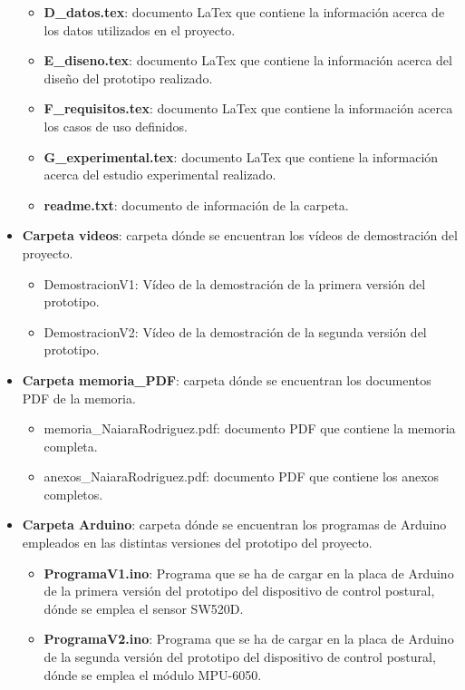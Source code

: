 \begin{itemize}
\begin{itemize}
        \item \textbf{D\_datos.tex}: documento LaTex que contiene la información acerca de los datos utilizados en el proyecto.
        \item \textbf{E\_diseno.tex}: documento LaTex que contiene la información acerca del diseño del prototipo realizado.
        \item \textbf{F\_requisitos.tex}: documento LaTex que contiene la información acerca los casos de uso definidos.
        \item \textbf{G\_experimental.tex}: documento LaTex que contiene la información acerca del estudio experimental realizado.
        \item \textbf{readme.txt}: documento de información de la carpeta.
    \end{itemize}
    \item \textbf{Carpeta videos}: carpeta dónde se encuentran los vídeos de demostración del proyecto.
        \begin{itemize}
            \item DemostracionV1:  Vídeo de la demostración de la primera versión del prototipo.
            \item DemostracionV2: Vídeo de la demostración de la segunda versión del prototipo.
        \end{itemize}
    \item \textbf{Carpeta memoria\_PDF}: carpeta dónde se encuentran los documentos PDF de la memoria.
        \begin{itemize}
            \item memoria\_NaiaraRodriguez.pdf:  documento PDF que contiene la memoria completa.
            \item anexos\_NaiaraRodriguez.pdf: documento PDF que contiene los anexos completos.
        \end{itemize}
    
    \item \textbf{Carpeta Arduino}: carpeta dónde se encuentran los programas de Arduino\cite{ArduinoIDE} empleados en las distintas versiones del prototipo del proyecto.
    \begin{itemize}
        \item \textbf{ProgramaV1.ino}: Programa que se ha de cargar en la placa de Arduino de la primera versión del prototipo del dispositivo de control postural, dónde se emplea el sensor SW520D.
        \item \textbf{ProgramaV2.ino}: Programa que se ha de cargar en la placa de Arduino de la segunda versión del prototipo del dispositivo de control postural, dónde se emplea el módulo MPU-6050.
    \end{itemize}
    

\end{itemize}
